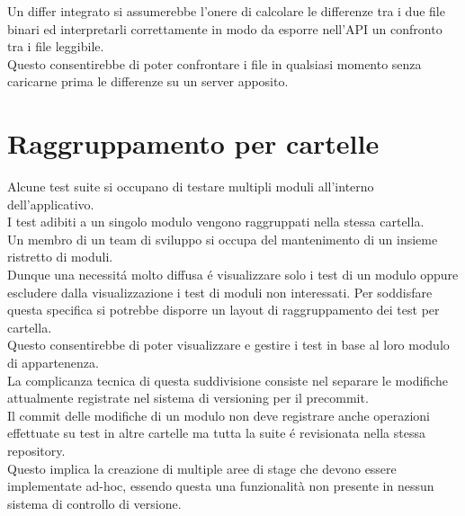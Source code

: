         Un differ integrato si assumerebbe l'onere di calcolare le differenze tra i due file binari ed interpretarli correttamente in modo da esporre nell'API un confronto tra i file leggibile.\\
        Questo consentirebbe di poter confrontare i file in qualsiasi momento senza caricarne prima le differenze su un server apposito.
    \section{Raggruppamento per cartelle}
        Alcune test suite si occupano di testare multipli moduli all'interno dell'applicativo.\\
        I test adibiti a un singolo modulo vengono raggruppati nella stessa cartella.\\
        Un membro di un team di sviluppo si occupa del mantenimento di un insieme ristretto di moduli.\\
        Dunque una necessit\'a molto diffusa \'e visualizzare solo i test di un modulo oppure escludere dalla visualizzazione i test di moduli non interessati. 
        Per soddisfare questa specifica si potrebbe disporre un layout di raggruppamento dei test per cartella.\\
        Questo consentirebbe di poter visualizzare e gestire i test in base al loro modulo di appartenenza.\\ 

        La complicanza tecnica di questa suddivisione consiste nel separare le modifiche attualmente registrate nel sistema di versioning per il precommit.\\
        Il commit delle modifiche di un modulo non deve registrare anche operazioni effettuate su test in altre cartelle ma tutta la suite \'e revisionata nella stessa repository.\\
        Questo implica la creazione di multiple aree di stage che devono essere implementate ad-hoc, essendo questa una funzionalità non presente in nessun sistema di controllo di versione.\\